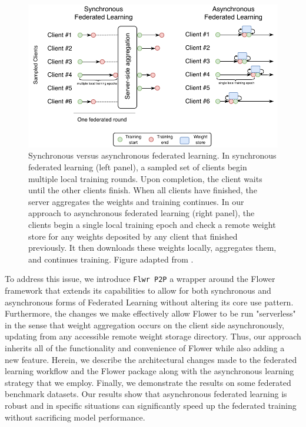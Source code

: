 \documentclass[twocolumn, switch]{article} %
\begin{document}
\begin{figure}
    \centering
    \includegraphics{graphics/async_fl.pdf}
    \caption{Synchronous versus asynchronous federated learning. In synchronous federated learning (left panel), a sampled set of clients begin multiple local training rounds. Upon completion, the client waits until the other clients finish. When all clients have finished, the server aggregates the weights and training continues. In our approach to asynchronous federated learning (right panel), the clients begin a single local training epoch and check a remote weight store for any weights deposited by any client that finished previously. It then downloads these weights locally, aggregates them, and continues training. Figure adapted from \cite{fed_async1}.}
    \label{fig:syncasync}
\end{figure}

To address this issue, we introduce \texttt{Flwr P2P} a wrapper around the Flower framework that extends its capabilities to allow for both synchronous and asynchronous forms of Federated Learning without altering its core use pattern. Furthermore, the changes we make effectively allow Flower to be run "serverless" in the sense that weight aggregation occurs on the client side asynchronously, updating from any accessible remote weight storage directory. Thus, our approach inherits all of the functionality and convenience of Flower while also adding a new feature. Herein, we describe the architectural changes made to the federated learning workflow and the Flower package along with the asynchronous learning strategy that we employ. Finally, we demonstrate the results on some federated benchmark datasets. Our results show that asynchronous federated learning is robust and in specific situations can significantly speed up the federated training without sacrificing model performance.  
\end{document}
